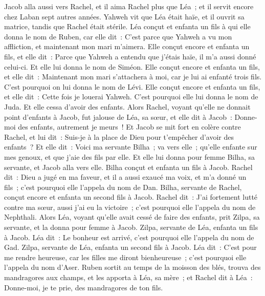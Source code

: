 \begin{multicols}{2}
Jacob alla aussi vers Rachel, et il aima Rachel plus que Léa~; et il servit encore chez Laban sept autres années.
Yahweh vit que Léa était haïe, et il ouvrit sa matrice, tandis que Rachel était stérile.
Léa conçut et enfanta un fils à qui elle donna le nom de Ruben, car elle dit~: C'est parce que Yahweh a vu mon affliction, et maintenant mon mari m'aimera.
Elle conçut encore et enfanta un fils, et elle dit~: Parce que Yahweh a entendu que j'étais haïe, il m'a aussi donné celui-ci. Et elle lui donna le nom de Siméon.
Elle conçut encore et enfanta un fils, et elle dit~: Maintenant mon mari s'attachera à moi, car je lui ai enfanté trois fils. C'est pourquoi on lui donna le nom de Lévi.
Elle conçut encore et enfanta un fils, et elle dit~: Cette fois je louerai Yahweh. C'est pourquoi elle lui donna le nom de Juda. Et elle cessa d'avoir des enfants.
\VerseOne{}Alors Rachel, voyant qu'elle ne donnait point d'enfants à Jacob, fut jalouse de Léa, sa sœur, et elle dit à Jacob~: Donne-moi des enfants, autrement je meurs~!
Et Jacob se mit fort en colère contre Rachel, et lui dit~: Suis-je à la place de Dieu pour t'empêcher d'avoir des enfants~?
Et elle dit~: Voici ma servante Bilha~; va vers elle~; qu'elle enfante sur mes genoux, et que j'aie des fils par elle.
Et elle lui donna pour femme Bilha, sa servante, et Jacob alla vers elle.
Bilha conçut et enfanta un fils à Jacob.
Rachel dit~: Dieu a jugé en ma faveur, et il a aussi exaucé ma voix, et m'a donné un fils~; c'est pourquoi elle l'appela du nom de Dan.
Bilha, servante de Rachel, conçut encore et enfanta un second fils à Jacob.
Rachel dit~: J'ai fortement lutté contre ma sœur, aussi j'ai eu la victoire~; c'est pourquoi elle l'appela du nom de Nephthali.
Alors Léa, voyant qu'elle avait cessé de faire des enfants, prit Zilpa, sa servante, et la donna pour femme à Jacob.
Zilpa, servante de Léa, enfanta un fils à Jacob.
Léa dit~: Le bonheur est arrivé, c'est pourquoi elle l'appela du nom de Gad.
Zilpa, servante de Léa, enfanta un second fils à Jacob.
Léa dit~: C'est pour me rendre heureuse, car les filles me diront bienheureuse~; c'est pourquoi elle l'appela du nom d'Aser.
Ruben sortit au temps de la moisson des blés, trouva des mandragores aux champs, et les apporta à Léa, sa mère~; et Rachel dit à Léa~: Donne-moi, je te prie, des mandragores de ton fils.

\end{multicols}
